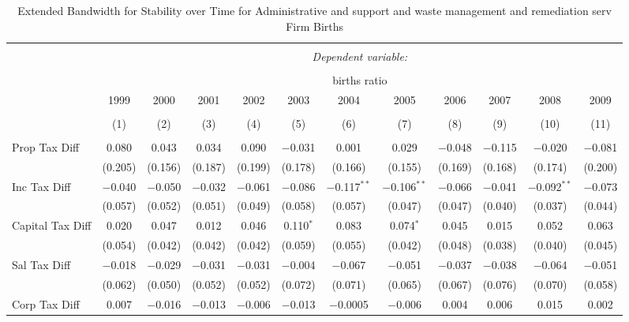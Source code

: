 
\begin{table}[!htbp] \centering 
  \caption{Extended Bandwidth for Stability over Time for  Administrative and support and waste management and remediation serv Firm Births} 
  \label{56 ebyear} 
\small 
\begin{tabular}{@{\extracolsep{5pt}}lccccccccccc} 
\\[-1.8ex]\hline 
\hline \\[-1.8ex] 
 & \multicolumn{11}{c}{\textit{Dependent variable:}} \\ 
\cline{2-12} 
\\[-1.8ex] & \multicolumn{11}{c}{births ratio} \\ 
 & 1999 & 2000 & 2001 & 2002 & 2003 & 2004 & 2005 & 2006 & 2007 & 2008 & 2009 \\ 
\\[-1.8ex] & (1) & (2) & (3) & (4) & (5) & (6) & (7) & (8) & (9) & (10) & (11)\\ 
\hline \\[-1.8ex] 
 Prop Tax Diff & 0.080 & 0.043 & 0.034 & 0.090 & $-$0.031 & 0.001 & 0.029 & $-$0.048 & $-$0.115 & $-$0.020 & $-$0.081 \\ 
  & (0.205) & (0.156) & (0.187) & (0.199) & (0.178) & (0.166) & (0.155) & (0.169) & (0.168) & (0.174) & (0.200) \\ 
  Inc Tax Diff & $-$0.040 & $-$0.050 & $-$0.032 & $-$0.061 & $-$0.086 & $-$0.117$^{**}$ & $-$0.106$^{**}$ & $-$0.066 & $-$0.041 & $-$0.092$^{**}$ & $-$0.073 \\ 
  & (0.057) & (0.052) & (0.051) & (0.049) & (0.058) & (0.057) & (0.047) & (0.047) & (0.040) & (0.037) & (0.044) \\ 
  Capital Tax Diff & 0.020 & 0.047 & 0.012 & 0.046 & 0.110$^{*}$ & 0.083 & 0.074$^{*}$ & 0.045 & 0.015 & 0.052 & 0.063 \\ 
  & (0.054) & (0.042) & (0.042) & (0.042) & (0.059) & (0.055) & (0.042) & (0.048) & (0.038) & (0.040) & (0.045) \\ 
  Sal Tax Diff & $-$0.018 & $-$0.029 & $-$0.031 & $-$0.031 & $-$0.004 & $-$0.067 & $-$0.051 & $-$0.037 & $-$0.038 & $-$0.064 & $-$0.051 \\ 
  & (0.062) & (0.050) & (0.052) & (0.052) & (0.072) & (0.071) & (0.065) & (0.067) & (0.076) & (0.070) & (0.058) \\ 
  Corp Tax Diff & 0.007 & $-$0.016 & $-$0.013 & $-$0.006 & $-$0.013 & $-$0.0005 & $-$0.006 & 0.004 & 0.006 & 0.015 & 0.002 \\ 

\end{tabular}
\end{table}
